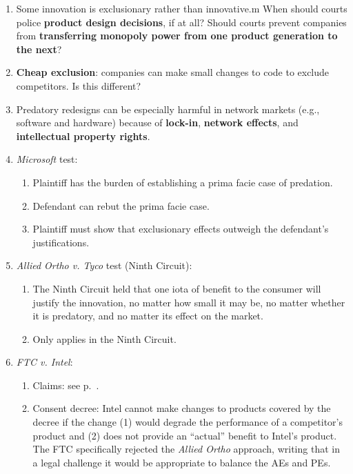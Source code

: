 \begin{enumerate}
    \item Some innovation is exclusionary rather than innovative.m When should 
    courts police \textbf{product design decisions}, if at all? Should courts 
    prevent companies from \textbf{transferring monopoly power from one 
    product generation to the next}?
    \item \textbf{Cheap exclusion}: companies can make small changes to code 
    to exclude competitors. Is this different?
    \item Predatory redesigns can be especially harmful in network markets 
    (e.g., software and hardware) because of \textbf{lock-in}, \textbf{network 
    effects}, and \textbf{intellectual property rights}.
    \item \emph{Microsoft} test:
    \begin{enumerate}
        \item Plaintiff has the burden of establishing a prima facie case of 
        predation.
        \item Defendant can rebut the prima facie case.
        \item Plaintiff must show that exclusionary effects outweigh the 
        defendant's justifications.
    \end{enumerate}
    \item \emph{Allied Ortho v. Tyco} test (Ninth Circuit):
    \begin{enumerate}
        \item The Ninth Circuit held that one iota of benefit to the consumer 
        will justify the innovation, no matter how small it may be, no matter 
        whether it is predatory, and no matter its effect on the market.
        \item Only applies in the Ninth Circuit.
    \end{enumerate}
    \item \emph{FTC v. Intel}:
    \begin{enumerate}
        \item Claims: see p.~\pageref{sub:intel}.
        \item Consent decree: Intel cannot make changes to products covered by 
        the decree if the change (1) would degrade the performance of a 
        competitor's product and (2) does not provide an ``actual'' benefit to 
        Intel's product. The FTC specifically rejected the \emph{Allied Ortho} 
        approach, writing that in a legal challenge it would be appropriate to 
        balance the AEs and PEs.
    \end{enumerate}
    
\end{enumerate}

